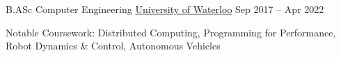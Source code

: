 \documentclass[]{awesome-cv}
\begin{document}
\begin{cventries}
	\cventry
	{B.ASc Computer Engineering}
	{\href{https://uwaterloo.ca/future-students/programs/computer-engineering}{University of Waterloo}}
	{}
	{Sep 2017 – Apr 2022}
	{\begin{cvitems}
	    \item Notable Coursework: Distributed Computing, Programming for Performance, Robot Dynamics \& Control, Autonomous Vehicles
	\end{cvitems}}
\end{cventries}
\end{document}
